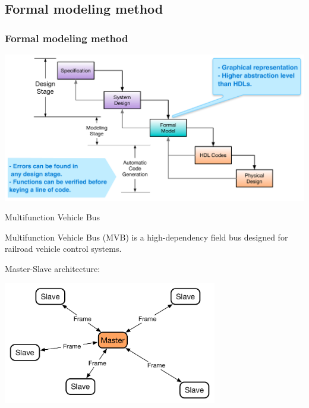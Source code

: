 \documentclass[12pt,beamer]{beamer}
\begin{document}
\subsection{Formal modeling method}

\begin{frame}
	\frametitle{Formal modeling method}
	\begin{center}
	\includegraphics[width=\textwidth]{pic/Development_Process.pdf}
	\end{center}
\end{frame}



\begin{frame}[c]{Multifunction Vehicle Bus}

Multifunction Vehicle Bus (MVB) is a high-dependency field bus designed for railroad vehicle control systems.

Master-Slave architecture:
\begin{center}
\includegraphics[width=0.7\textwidth]{pic/mvb.pdf}
\end{center}
\end{frame}
\end{document}
